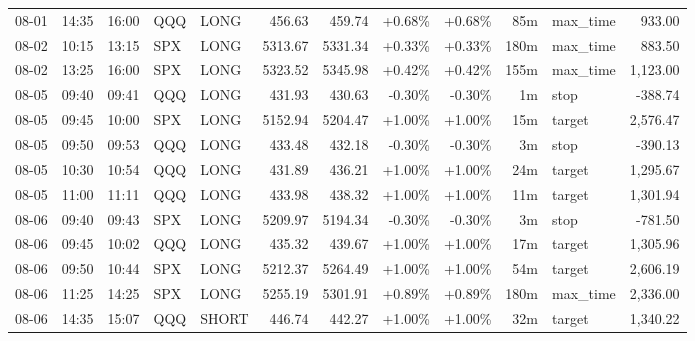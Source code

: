 \documentclass[11pt,a4paper]{article}
\begin{document}
\begin{center}
\begin{longtable}{>{\color{txtmain}}l l l l l r r r r r >{\color{txtmain}}l r}
08-01 & 14:35 & 16:00 & QQQ & LONG & 456.63 & 459.74 & \textcolor{wingreen}{+0.68\%} & \textcolor{wingreen}{+0.68\%} & 85m & max\_time & \textcolor{wingreen}{933.00} \\
08-02 & 10:15 & 13:15 & SPX & LONG & 5313.67 & 5331.34 & \textcolor{wingreen}{+0.33\%} & \textcolor{wingreen}{+0.33\%} & 180m & max\_time & \textcolor{wingreen}{883.50} \\
08-02 & 13:25 & 16:00 & SPX & LONG & 5323.52 & 5345.98 & \textcolor{wingreen}{+0.42\%} & \textcolor{wingreen}{+0.42\%} & 155m & max\_time & \textcolor{wingreen}{1,123.00} \\
08-05 & 09:40 & 09:41 & QQQ & LONG & 431.93 & 430.63 & \textcolor{lossred}{-0.30\%} & \textcolor{lossred}{-0.30\%} & 1m & stop & \textcolor{lossred}{-388.74} \\
08-05 & 09:45 & 10:00 & SPX & LONG & 5152.94 & 5204.47 & \textcolor{wingreen}{+1.00\%} & \textcolor{wingreen}{+1.00\%} & 15m & target & \textcolor{wingreen}{2,576.47} \\
08-05 & 09:50 & 09:53 & QQQ & LONG & 433.48 & 432.18 & \textcolor{lossred}{-0.30\%} & \textcolor{lossred}{-0.30\%} & 3m & stop & \textcolor{lossred}{-390.13} \\
08-05 & 10:30 & 10:54 & QQQ & LONG & 431.89 & 436.21 & \textcolor{wingreen}{+1.00\%} & \textcolor{wingreen}{+1.00\%} & 24m & target & \textcolor{wingreen}{1,295.67} \\
08-05 & 11:00 & 11:11 & QQQ & LONG & 433.98 & 438.32 & \textcolor{wingreen}{+1.00\%} & \textcolor{wingreen}{+1.00\%} & 11m & target & \textcolor{wingreen}{1,301.94} \\
08-06 & 09:40 & 09:43 & SPX & LONG & 5209.97 & 5194.34 & \textcolor{lossred}{-0.30\%} & \textcolor{lossred}{-0.30\%} & 3m & stop & \textcolor{lossred}{-781.50} \\
08-06 & 09:45 & 10:02 & QQQ & LONG & 435.32 & 439.67 & \textcolor{wingreen}{+1.00\%} & \textcolor{wingreen}{+1.00\%} & 17m & target & \textcolor{wingreen}{1,305.96} \\
08-06 & 09:50 & 10:44 & SPX & LONG & 5212.37 & 5264.49 & \textcolor{wingreen}{+1.00\%} & \textcolor{wingreen}{+1.00\%} & 54m & target & \textcolor{wingreen}{2,606.19} \\
08-06 & 11:25 & 14:25 & SPX & LONG & 5255.19 & 5301.91 & \textcolor{wingreen}{+0.89\%} & \textcolor{wingreen}{+0.89\%} & 180m & max\_time & \textcolor{wingreen}{2,336.00} \\
08-06 & 14:35 & 15:07 & QQQ & SHORT & 446.74 & 442.27 & \textcolor{wingreen}{+1.00\%} & \textcolor{wingreen}{+1.00\%} & 32m & target & \textcolor{wingreen}{1,340.22} \\

\end{longtable}
\end{center}
\end{document}
